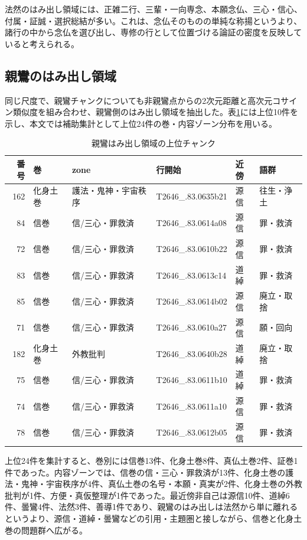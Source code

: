 \documentclass[uplatex,dvipdfmx,11pt,a4paper]{jsarticle}
\begin{document}
法然のはみ出し領域には、正雑二行、三輩・一向専念、本願念仏、三心・信心、付属・証誠・選択総結が多い。これは、念仏そのものの単純な称揚というより、諸行の中から念仏を選び出し、専修の行として位置づける論証の密度を反映していると考えられる。

\subsection{親鸞のはみ出し領域}

同じ尺度で、親鸞チャンクについても非親鸞点からの2次元距離と高次元コサイン類似度を組み合わせ、親鸞側のはみ出し領域を抽出した。表\ref{tab:shinran-protrusion}には上位10件を示し、本文では補助集計として上位24件の巻・内容ゾーン分布を用いる。

\begin{table}[H]
\centering
\small
\caption{親鸞はみ出し領域の上位チャンク}
\label{tab:shinran-protrusion}
\begin{tabular}{@{}rlllll@{}}
\toprule
番号 & 巻 & zone & 行開始 & 近傍 & 語群 \\
\midrule
162 & 化身土巻 & 護法・鬼神・宇宙秩序 & T2646\_.83.0635b21 & 源信 & 往生・浄土 \\
84 & 信巻 & 信/三心・罪救済 & T2646\_.83.0614a08 & 源信 & 罪・救済 \\
72 & 信巻 & 信/三心・罪救済 & T2646\_.83.0610b22 & 源信 & 罪・救済 \\
83 & 信巻 & 信/三心・罪救済 & T2646\_.83.0613c14 & 道綽 & 罪・救済 \\
85 & 信巻 & 信/三心・罪救済 & T2646\_.83.0614b02 & 源信 & 廃立・取捨 \\
71 & 信巻 & 信/三心・罪救済 & T2646\_.83.0610a27 & 源信 & 願・回向 \\
182 & 化身土巻 & 外教批判 & T2646\_.83.0640b28 & 道綽 & 廃立・取捨 \\
75 & 信巻 & 信/三心・罪救済 & T2646\_.83.0611b10 & 道綽 & 罪・救済 \\
74 & 信巻 & 信/三心・罪救済 & T2646\_.83.0611a10 & 源信 & 罪・救済 \\
78 & 信巻 & 信/三心・罪救済 & T2646\_.83.0612b05 & 源信 & 罪・救済 \\
\bottomrule
\end{tabular}
\end{table}

上位24件を集計すると、巻別には信巻13件、化身土巻8件、真仏土巻2件、証巻1件であった。内容ゾーンでは、信巻の信・三心・罪救済が13件、化身土巻の護法・鬼神・宇宙秩序が4件、真仏土巻の名号・本願・真実が2件、化身土巻の外教批判が1件、方便・真仮整理が1件であった。最近傍非自己は源信10件、道綽6件、曇鸞4件、法然3件、善導1件であり、親鸞のはみ出しは法然から単に離れるというより、源信・道綽・曇鸞などの引用・主題圏と接しながら、信巻と化身土巻の問題群へ広がる。
\end{document}

